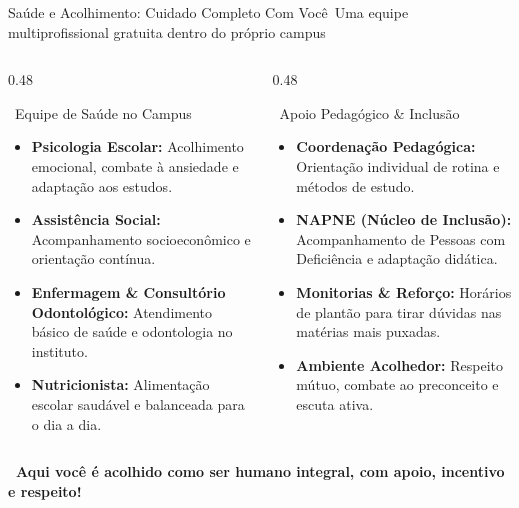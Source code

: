 \begin{frame}{Saúde e Acolhimento: Cuidado Completo Com Você}{\faHeartbeat\ Uma equipe multiprofissional gratuita dentro do próprio campus}
  \begin{columns}[t]
    \begin{column}{0.48\textwidth}
      \begin{purplecard}{\faUserMd\ Equipe de Saúde no Campus}
        \tiny
        \begin{itemize}\setlength{\itemsep}{0.18em}
          \item \textbf{Psicologia Escolar:} Acolhimento emocional, combate à ansiedade e adaptação aos estudos.
          \item \textbf{Assistência Social:} Acompanhamento socioeconômico e orientação contínua.
          \item \textbf{Enfermagem \& Consultório Odontológico:} Atendimento básico de saúde e odontologia no instituto.
          \item \textbf{Nutricionista:} Alimentação escolar saudável e balanceada para o dia a dia.
        \end{itemize}
      \end{purplecard}
    \end{column}
    
    \begin{column}{0.48\textwidth}
      \begin{greencard}{\faUniversalAccess\ Apoio Pedagógico \& Inclusão}
        \tiny
        \begin{itemize}\setlength{\itemsep}{0.18em}
          \item \textbf{Coordenação Pedagógica:} Orientação individual de rotina e métodos de estudo.
          \item \textbf{NAPNE (Núcleo de Inclusão):} Acompanhamento de Pessoas com Deficiência e adaptação didática.
          \item \textbf{Monitorias \& Reforço:} Horários de plantão para tirar dúvidas nas matérias mais puxadas.
          \item \textbf{Ambiente Acolhedor:} Respeito mútuo, combate ao preconceito e escuta ativa.
        \end{itemize}
      \end{greencard}
    \end{column}
  \end{columns}
  
  \vspace{0.08cm}
  \begin{center}
    \scriptsize \textcolor{IFCEDarkGreen}{\textbf{\faHandHoldingHeart\ Aqui você é acolhido como ser humano integral, com apoio, incentivo e respeito!}}
  \end{center}
\end{frame}
